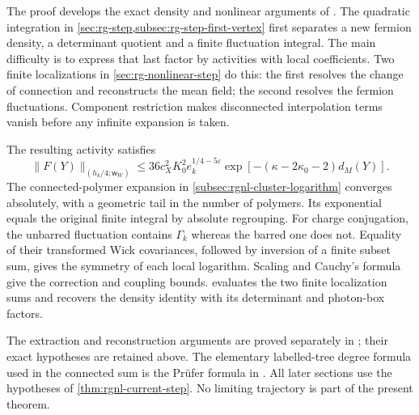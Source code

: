 The proof develops the exact density and nonlinear arguments of
\cite[\S\S13--14]{QED3Master}. The quadratic integration in \cref{sec:rg-step,subsec:rg-step-first-vertex} first
separates a new fermion density, a determinant quotient and a finite
fluctuation integral. The main difficulty is to express that last
factor by activities with local coefficients. Two finite
localizations in \cref{sec:rg-nonlinear-step} do this: the first resolves the change of connection
and reconstructs the mean field; the second resolves the fermion
fluctuations. Component restriction makes disconnected interpolation
terms vanish before any infinite expansion is taken.

The resulting activity satisfies
\[
 \|F(Y)\|_{(h_k/4;\mathsf w_W)}
 \le36c_X^2K_0^2e_k^{1/4-5\varepsilon}
                 \exp[-(\kappa-2\kappa_0-2)d_M(Y)].
\]
The connected-polymer expansion in \cref{subsec:rgnl-cluster-logarithm}
converges absolutely, with a
geometric tail in the number of polymers. Its exponential equals
the original finite integral by absolute regrouping. For charge
conjugation, the unbarred fluctuation contains $\Gamma_k$ whereas
the barred one does not. Equality of their transformed Wick
covariances, followed by inversion of a finite subset sum, gives
the symmetry of each local logarithm. Scaling and Cauchy's formula
give the correction and coupling bounds. 
evaluates the two finite localization sums and recovers the density
identity with its determinant and photon-box factors.

The extraction and reconstruction arguments are proved separately in
\cite{NormalizedContraction}; their exact hypotheses are retained
above. The elementary labelled-tree degree formula used in the
connected sum is the Pr\"ufer formula in
\cite[Proposition~4]{PostnikovLin2019}. All later sections use the
hypotheses of \cref{thm:rgnl-current-step}. No limiting trajectory is
part of the present theorem.
